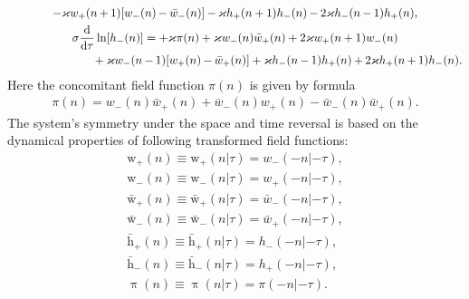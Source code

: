 \documentclass[pdftex]{sigma}
\numberwithin{equation}{section}
\begin{document}
\begin{gather}
	 - \varkappa w_{+}(n\hspace{-0.4pt}+\hspace{-0.4pt}1)[w_{-}(n)\hspace{-0.4pt}-\hspace{-0.4pt}\bar{w}_{-}(n)]
	\hspace{-0.4pt}-\hspace{-0.4pt} \varkappa h_{+}(n+1)h_{-}(n)\hspace{-0.4pt} -\hspace{-0.4pt} 2\varkappa h_{-}(n\hspace{-0.4pt}-\hspace{-0.4pt}1)h_{+}(n),\nonumber
\\
	 \sigma\frac{\mathrm{d}}{\mathrm{d}\tau}\ln[h_{-}(n)] = +\varkappa \pi(n) + \varkappa w_{-}(n)\bar{w}_{+}(n) + 2\varkappa w_{+}(n+1)w_{-}(n) \label{eq-7.6}\\
\hspace{0.25mm}\hphantom{\sigma\frac{\mathrm{d}}{\mathrm{d}\tau}\ln[h_{-}(n)] =}{}
	 + \varkappa w_{-}(n\hspace{-0.4pt}-\hspace{-0.4pt}1)[w_{+}(n)\hspace{-0.4pt}-\hspace{-0.4pt}\bar{w}_{+}(n)]
	 + \varkappa h_{-}(n\hspace{-0.4pt}-\hspace{-0.4pt}1)h_{+}(n)\hspace{-0.4pt} +\hspace{-0.4pt} 2\varkappa h_{+}(n\hspace{-0.4pt}+\hspace{-0.4pt}1)h_{-}(n) .\nonumber
\end{gather}
Here the concomitant field function $\pi(n)$ is given by formula
\begin{gather*}%
	\pi(n)=w_{-}(n)\bar{w}_{+}(n)+\bar{w}_{-}(n)w_{+}(n)-\bar{w}_{-}(n)\bar{w}_{+}(n) .
\end{gather*}
The system's symmetry under the space and time reversal is based on the dynamical properties of following transformed field functions:
\begin{gather}\label{eq-7.8}
	\mathrm{w}_{+}(n)\equiv\mathrm{w}_{+}(n|\tau)=w_{-}(-n|-\tau),
\\ \label{eq-7.25}
	\mathrm{w}_{-}(n)\equiv\mathrm{w}_{-}(n|\tau)=w_{+}(-n|-\tau),
\\ \label{eq-7.26}
	\bar{\mathrm{w}}_{+}(n)\equiv\bar{\mathrm{w}}_{+}(n|\tau)=\bar{w}_{-}(-n|-\tau),
\\ \label{eq-7.27}
	\bar{\mathrm{w}}_{-}(n)\equiv\bar{\mathrm{w}}_{-}(n|\tau)=\bar{w}_{+}(-n|-\tau),
\\ \label{eq-7.28}
	\bar{\mathrm{h}}_{+}(n)\equiv\bar{\mathrm{h}}_{+}(n|\tau)=h_{-}(-n|-\tau),
\\ \label{eq-7.29}
	\bar{\mathrm{h}}_{-}(n)\equiv\bar{\mathrm{h}}_{-}(n|\tau)=h_{+}(-n|-\tau),
\\ %
	\uppi (n)\equiv\uppi(n|\tau)=\pi(-n|-\tau) . \nonumber
\end{gather}
\end{document}
